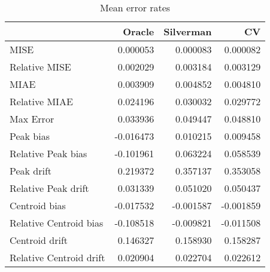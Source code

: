 \begin{table}[ht]
\centering
\begin{tabular}{lrrr}
  \hline
 & Oracle & Silverman & CV \\ 
  \hline
MISE & 0.000053 & 0.000083 & 0.000082 \\ 
  Relative MISE & 0.002029 & 0.003184 & 0.003129 \\ 
  MIAE & 0.003909 & 0.004852 & 0.004810 \\ 
  Relative MIAE & 0.024196 & 0.030032 & 0.029772 \\ 
  Max Error & 0.033936 & 0.049447 & 0.048810 \\ 
  Peak bias & -0.016473 & 0.010215 & 0.009458 \\ 
  Relative Peak bias & -0.101961 & 0.063224 & 0.058539 \\ 
  Peak drift & 0.219372 & 0.357137 & 0.353058 \\ 
  Relative Peak drift & 0.031339 & 0.051020 & 0.050437 \\ 
  Centroid bias & -0.017532 & -0.001587 & -0.001859 \\ 
  Relative Centroid bias & -0.108518 & -0.009821 & -0.011508 \\ 
  Centroid drift & 0.146327 & 0.158930 & 0.158287 \\ 
  Relative Centroid drift & 0.020904 & 0.022704 & 0.022612 \\ 
   \hline
\end{tabular}
\caption{Mean error rates} 
\label{tbl:mean_error_rates}
\end{table}
